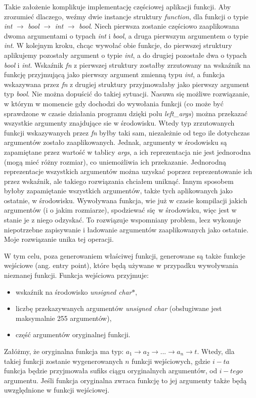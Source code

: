 \documentclass[declaration,shortabstract]{iithesis}
\begin{document}
Takie założenie komplikuje implementację częściowej aplikacji funkcji. Aby 
zrozumieć dlaczego, weźmy dwie instancje struktury \textit{function}, dla 
funkcji o typie \textit{int $\rightarrow$ bool $\rightarrow$ int 
$\rightarrow$ bool}. Niech pierwsza zostanie częściowo zaaplikowana dwoma 
argumentami o typach \textit{int} i \textit{bool}, a druga pierwszym argumentem
o typie \textit{int}. W kolejnym kroku, chcąc wywołać obie funkcje, do 
pierwszej struktury aplikujemy pozostały argument o typie \textit{int}, a do 
drugiej pozostałe dwa o typach \textit{bool} i \textit{int}. Wskaźnik \textit
{fn} z pierwszej struktury zostałby zrzutowany na wskaźnik na funkcję 
przyjmującą jako pierwszy argument zmienną typu \textit{int}, a funkcja 
wskazywana przez \textit{fn} z drugiej struktury przyjmowałaby jako pierwszy 
argument typ \textit{bool}. Nie można dopuścić do takiej sytuacji. Nasuwa się 
możliwe rozwiązanie, w którym w momencie gdy dochodzi do wywołania funkcji (co 
może być sprawdzone w czasie działania programu dzięki polu 
\textit{left\_args}) można przekazać wszystkie argumenty znajdujące sie w 
środowisku. Wtedy typ zrzutowanych funkcji wskazywanych przez \textit{fn} byłby 
taki sam, niezależnie od tego ile dotychczas argumentów zostało zaaplikowanych.
Jednak, argumenty w środowisku są zapamiętane przez wartość w tablicy \textit
{args}, a ich reprezentacja nie jest jednorodna (mogą mieć różny rozmiar), 
co uniemożliwia ich przekazanie.
Jednorodną reprezentacje wszystkich argumentów można uzyskać poprzez 
reprezentowanie ich przez wskaźnik, ale takiego rozwiązania chciałem uniknąć.
Innym sposobem byłoby zapamiętanie wszystkich argumentów, także tych 
aplikowanych jako ostatnie, w środowisku. Wywoływana funkcja, wie już w czasie 
kompilacji jakich argumentów (i o jakim rozmiarze), spodziewać się w środowisku,
więc jest w stanie je z niego odzyskać. To rozwiązuje wspomniany 
problem, lecz wykonuje niepotrzebne zapisywanie i ładowanie argumentów 
zaaplikowanych jako ostatnie. Moje rozwiązanie unika tej operacji. 

W tym celu, poza generowaniem właściwej funkcji, generowane są także funkcje 
wejściowe (ang. entry point), które będą używane w przypadku wywoływania 
nieznanej funkcji. 
Funkcja wejściowa przyjmuje: 
\begin{itemize}
  \item wskaźnik na środowisko \textit{unsigned char$\ast$},
  \item liczbę przekazywanych argumentów \textit{unsigned char} 
  (obsługiwane jest maksymalnie 255 argumentów),
  \item część argumentów oryginalnej funkcji.
\end{itemize}
Załóżmy, że oryginalna funkcja ma typ: $a_1 \rightarrow a_2 \rightarrow ...
\rightarrow a_n \rightarrow t$. Wtedy, dla takiej funkcji zostanie wygenerowanych $n$ funkcji 
wejściowych, gdzie $i-ta$ funkcja będzie przyjmowała sufiks ciągu oryginalnych
argumentów, od $i-tego$ argumentu. Jeśli funkcja oryginalna zwraca funkcję to 
jej argumenty także będą uwzględnione w funkcji wejściowej.
\end{document}
